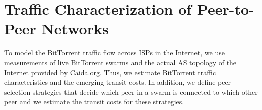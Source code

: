 \section{Traffic Characterization of Peer-to-Peer Networks}\label{sec:aslevel:p2p}


To model the BitTorrent traffic flow across ISPs in the Internet, we use measurements of live BitTorrent swarms and the actual AS topology of the Internet provided by Caida.org. Thus, we estimate BitTorrent traffic characteristics and the emerging transit costs.
In addition, we define peer selection strategies that decide which peer in a swarm is connected to which other peer and we estimate the transit costs for these strategies.

